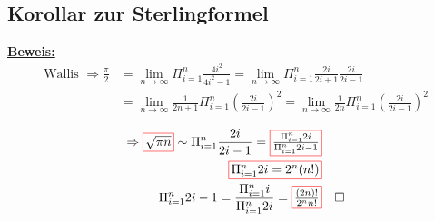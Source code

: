 \subsection{Korollar zur Sterlingformel}

\renewcommand*{\rectangled}[1]{\tikz[baseline=(char.base)]{
  \node[shape=rectangle,draw,inner sep=2pt, red] (char) {\textcolor{black}{#1}};}}
\newcommand{\pihalbe}{\frac{\pi}{2}}
\newcommand{\limmesngegenunendlich}{\lim_{n \rightarrow \infty}}
\newcommand{\pivoneinsbisn}{\Pi_{i = 1}^{n}}
\underline{\textbf{Beweis:}}
\begin{align*}
    \text{Wallis } \Rightarrow \frac{\pi}{2} &= \limmesngegenunendlich \pivoneinsbisn \frac{4i^2}{4i^2-1} = \limmesngegenunendlich \pivoneinsbisn\frac{2i}{2i+1} \frac{2i}{2i-1}\\
    &= \limmesngegenunendlich \frac{1}{2n+1} \pivoneinsbisn\left(\frac{2i}{2i-1} \right)^2 = \limmesngegenunendlich \frac{1}{2n}\pivoneinsbisn \left(\frac{2i}{2i-1} \right)^2\\
\end{align*}
\begin{align*}
    \Rightarrow \rectangled{$\sqrt{\pi n}$} \sim \pivoneinsbisn \frac{2i}{2i-1} = \rectangled{$\frac{\pivoneinsbisn 2i}{\pivoneinsbisn 2i-1}$}\\
    \rectangled{$\pivoneinsbisn 2i = 2^n (n!)$}\\
    \pivoneinsbisn 2i-1 = \frac{\pivoneinsbisn i}{\pivoneinsbisn 2i} = \rectangled{$\frac{(2n)!}{2^n n!}$} && \square
\end{align*}

